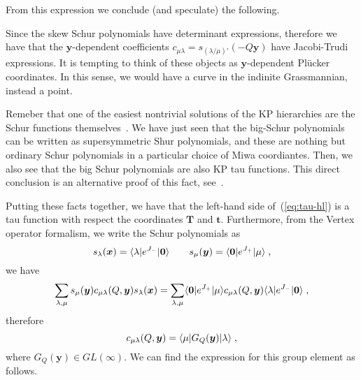 \documentclass[a4paper,11pt]{amsart}
\begin{document}
From this expression we conclude (and speculate) the following. 

\begin{remark}
Since the skew Schur polynomials have determinant expressions,
therefore we have that the \(\bm{y}\)-dependent coefficients \(c_{\mu
  \lambda} = s_{(\lambda/\mu)'}(-Q\bm{y})\) have Jacobi-Trudi
expressions. It is tempting to think of these objects as
\(\bm{y}\)-dependent Pl\"ucker coordinates. In this sense, we would have a curve in 
the indinite Grassmannian, instead a point.
\end{remark}

\begin{remark}
Remeber that one of the easiest nontrivial solutions of the KP
hierarchies are the Schur functions
themselves~\emph{\cite{Zabrodin2018}}. We have just seen that the
big-Schur polynomials can be written as supersymmetric Shur
polynomials, and these are nothing but ordinary Schur polynomials in a
particular choice of Miwa coordiantes. Then, we also see that 
the big Schur polynomials are also KP tau functions. This direct conclusion 
is an alternative proof of this fact, see~\emph{\cite{Necoechea:2019wbg}}.
\end{remark}

Putting these facts together, we have that the left-hand side
of~(\ref{eq:tau-hl}) is a tau function with respect the coordinates
\(\bm{T}\) and \(\bm{t}\). Furthermore, from the Vertex operator
formalism, we write the Schur polynomials as
\begin{equation}
  s_{\lambda}(\bm{x}) = \langle\lambda\rvert e^{J_-}\lvert\bm{0}\rangle\qquad
  s_{\mu}(\bm{y}) = \langle\bm{0}\rvert e^{J_+}\lvert\mu\rangle\; ,
\end{equation}
we have
\begin{equation}
  \sum_{\lambda,\mu } s_\mu(\bm{y})c_{\mu\lambda}(Q,\bm{y}) s_\lambda(\bm{x}) = 
  \sum_{\lambda,\mu } \langle\bm{0}\rvert e^{J_+}\lvert\mu\rangle c_{\mu\lambda}(Q,\bm{y})
  \langle\lambda\rvert e^{J_-}\lvert\bm{0}\rangle \; ,
\end{equation}
therefore 
\begin{equation}
  c_{\mu\lambda}(Q, \bm{y}) = \langle\mu\rvert G_Q(\bm{y}) \lvert\lambda\rangle\; ,
\end{equation}
where \(G_Q(\bm{y}) \in GL(\infty)\). We can find the expression for
this group element as follows. 
\end{document}
